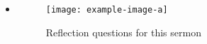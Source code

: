 \begin{itemize}
  \item{\begin{figure}[H]
    \centering
    \texttt{[image: example-image-a]}
    \caption[]{Reflection questions for this sermon}
    \label{}
  \end{figure}}
\end{itemize}